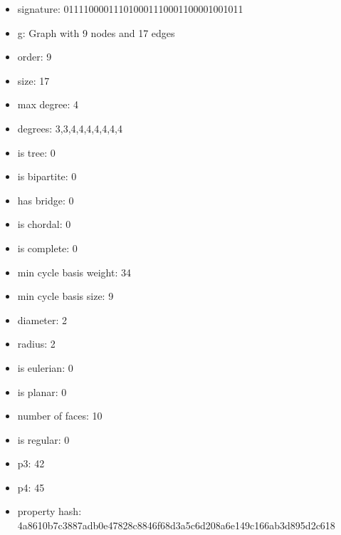 \newpage
\begin{figure}
\end{figure}
\begin{itemize}
\item signature: 011110000111010001110001100001001011
\item g: Graph with 9 nodes and 17 edges
\item order: 9
\item size: 17
\item max degree: 4
\item degrees: 3,3,4,4,4,4,4,4,4
\item is tree: 0
\item is bipartite: 0
\item has bridge: 0
\item is chordal: 0
\item is complete: 0
\item min cycle basis weight: 34
\item min cycle basis size: 9
\item diameter: 2
\item radius: 2
\item is eulerian: 0
\item is planar: 0
\item number of faces: 10
\item is regular: 0
\item p3: 42
\item p4: 45
\item property hash: 4a8610b7c3887adb0e47828c8846f68d3a5c6d208a6e149c166ab3d895d2c618
\end{itemize}
